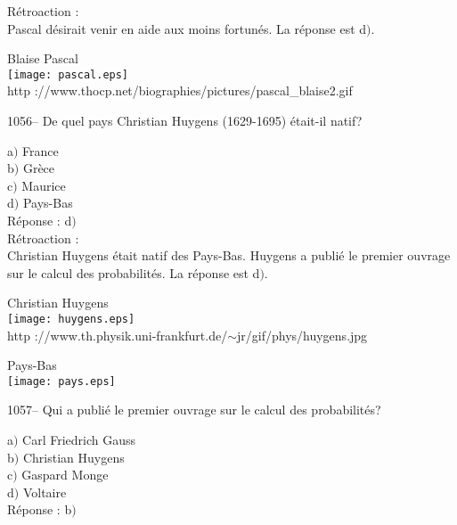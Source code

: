 ﻿\documentclass[letterpaper, 12pt]{article}
\begin{document}
R\'etroaction : \\
Pascal d\'esirait venir en aide aux moins fortun\'es.
La r\'eponse est d$)$.\\

        \begin{center}
        Blaise Pascal\\
    \texttt{[image: pascal.eps]}\\
        {\footnotesize http
://www.thocp.net/biographies/pictures/pascal\_blaise2.gif}
    \end{center}

1056-- De quel pays Christian Huygens (1629-1695) \'etait-il natif?

a$)$ France \\
b$)$ Gr\`ece  \\
c$)$ Maurice  \\
d$)$ Pays-Bas \\

R\'eponse : d$)$\\

R\'etroaction : \\
Christian Huygens \'etait natif des Pays-Bas. Huygens a publi\'e le
premier ouvrage sur le calcul des probabilit\'es.
La r\'eponse est d$)$.\\

        \begin{center}
        Christian Huygens\\
    \texttt{[image: huygens.eps]}\\
        {\footnotesize http
://www.th.physik.uni-frankfurt.de/$\sim$jr/gif/phys/huygens.jpg}
    \end{center}

        \begin{center}
        Pays-Bas\\
    \texttt{[image: pays.eps]}\\
    \end{center}

1057-- Qui a publi\'e le premier ouvrage sur le calcul des
probabilit\'es?

a$)$ Carl Friedrich Gauss \\
b$)$ Christian Huygens \\
c$)$ Gaspard Monge  \\
d$)$ Voltaire  \\

R\'eponse : b$)$\\
\end{document}
